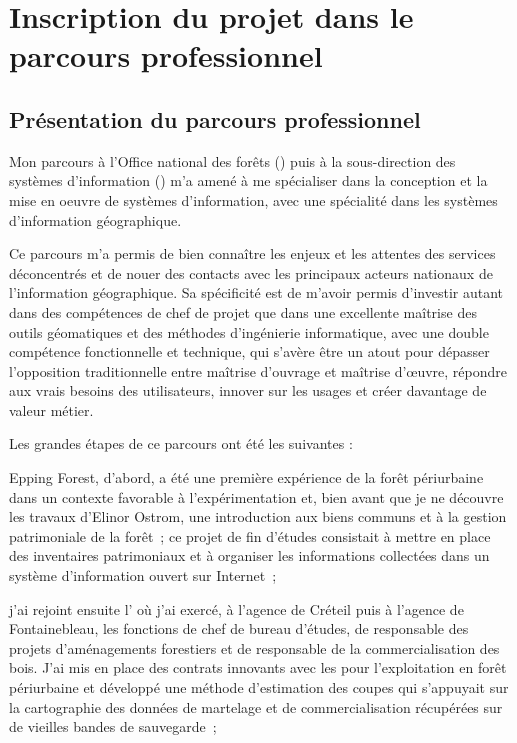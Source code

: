 \section[origin]
{Inscription du projet dans le parcours professionnel}

\subsection
{Présentation du parcours professionnel}

Mon parcours à l'Office national des forêts ({\ONF})
puis à la sous-direction des systèmes d'information ({\SDSI})
m'a amené à me spécialiser dans la conception et la mise en oeuvre
de systèmes d'information, avec une spécialité dans les systèmes d'information géographique.

Ce parcours m'a permis de bien connaître les enjeux et les attentes
des services déconcentrés et de nouer des contacts avec les principaux
acteurs nationaux de l'information géographique.
Sa spécificité est de m'avoir permis d'investir autant dans
des compétences de chef de projet que dans une excellente maîtrise
des outils géomatiques et des méthodes d'ingénierie informatique,
avec une double compétence fonctionnelle et technique,
qui s'avère être un atout pour dépasser l'opposition traditionnelle
entre maîtrise d'ouvrage et maîtrise d’œuvre,
répondre aux vrais besoins des utilisateurs, innover sur les usages
et créer davantage de valeur métier.

Les grandes étapes de ce parcours ont été les suivantes :

\startitemize[n]

\item Epping Forest, d'abord,
      a été une première expérience de la forêt
      périurbaine dans un contexte favorable à l'expérimentation
      et, bien avant que je ne découvre les travaux d'Elinor Ostrom,
      une introduction aux biens communs et à la gestion patrimoniale de la forêt~;
      ce projet de fin d'études consistait à mettre en place des inventaires patrimoniaux
      et à organiser les informations collectées dans un système d'information
      ouvert sur Internet~;

\item j'ai rejoint ensuite l'{\ONF}
      où j'ai exercé, à l'agence de Créteil puis à l'agence de Fontainebleau,
      les fonctions de chef de bureau d'études, de responsable
      des projets d'aménagements forestiers et de responsable
      de la commercialisation des bois. J'ai mis en place
      des contrats innovants avec les {\ETF} pour l'exploitation
      en forêt périurbaine et développé une méthode d'estimation
      des coupes qui s'appuyait sur la cartographie
      des données de martelage et de commercialisation
      récupérées sur de vieilles bandes de sauvegarde~;

